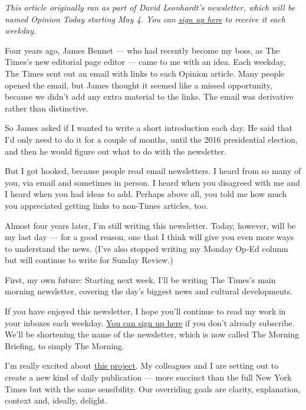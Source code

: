 \emph{This article originally ran as part of David Leonhardt's
newsletter, which will be named Opinion Today starting May 4. You can}
\href{https://www.nytimes.com/newsletters/opinion-todaynl}{\emph{sign up
here}} \emph{to receive it each weekday.}

Four years ago, James Bennet --- who had recently become my boss, as The
Times's new editorial page editor --- came to me with an idea. Each
weekday, The Times sent out an email with links to each Opinion article.
Many people opened the email, but James thought it seemed like a missed
opportunity, because we didn't add any extra material to the links. The
email was derivative rather than distinctive.

So James asked if I wanted to write a short introduction each day. He
said that I'd only need to do it for a couple of months, until the 2016
presidential election, and then he would figure out what to do with the
newsletter.

But I got hooked, because people read email newsletters. I heard from so
many of you, via email and sometimes in person. I heard when you
disagreed with me and I heard when you had ideas to add. Perhaps above
all, you told me how much you appreciated getting links to non-Times
articles, too.

Almost four years later, I'm still writing this newsletter. Today,
however, will be my last day --- for a good reason, one that I think
will give you even more ways to understand the news. (I've also stopped
writing my Monday Op-Ed column but will continue to write for Sunday
Review.)

First, my own future: Starting next week, I'll be writing The Times's
main morning newsletter, covering the day's biggest news and cultural
developments.

If you have enjoyed this newsletter, I hope you'll continue to read my
work in your inboxes each weekday.
\href{https://www.nytimes.com/newsletters/morning-briefing}{You can sign
up here} if you don't already subscribe. We'll be shortening the name of
the newsletter, which is now called The Morning Briefing, to simply The
Morning.

I'm really excited about
\href{https://www.nytco.com/press/new-role-for-david-leonhardt/}{this
project}. My colleagues and I are setting out to create a new kind of
daily publication --- more succinct than the full New York Times but
with the same sensibility. Our overriding goals are clarity,
explanation, context and, ideally, delight.

